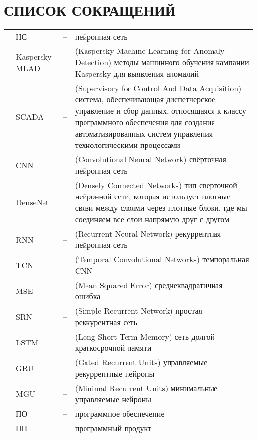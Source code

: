 \sectionbreak \section*{ 
    \gostTitleFont
    \redline
    СПИСОК СОКРАЩЕНИЙ
}
\titlespace

{\gostFont

\begin{tabular}{p{0.85cm} p{1.75cm} p{0.3cm} p{131.5mm}}
    & НС & {--} & нейронная сеть \\
    & Kaspersky MLAD & {--} & (Kaspersky Machine Learning for Anomaly Detection) методы машинного обучения кампании Kaspersky для выявления аномалий \\
    & SCADA & {--} & (Supervisory for Control And Data Acquisition) система, обеспечивающая диспетчерское управление и сбор данных, относящаяся к классу программного обеспечения для создания автоматизированных систем управления технологическими процессами \\
    & CNN & {--} & (Convolutional Neural Network) свёрточная нейронная сеть \\
    & DenseNet & {--} & (Densely Connected Networks) тип сверточной нейронной сети, которая использует плотные связи между слоями через плотные блоки, где мы соединяем все слои напрямую друг с другом \\
    & RNN & {--} & (Recurrent Neural Network) рекуррентная нейронная сеть \\
    & TCN & {--} & (Temporal Convolutional Networks) темпоральная CNN \\
    & MSE & {--} & (Mean Squared Error) среднеквадратичная ошибка \\
    & SRN & {--} & (Simple Recurrent Network) простая реккурентная сеть \\
    & LSTM & {--} & (Long Short-Term Memory) сеть долгой краткосрочной памяти \\
    & GRU & {--} & (Gated Recurrent Units) управляемые рекуррентные нейроны \\
    & MGU & {--} & (Minimal Recurrent Units) минимальные управляемые нейроны \\
    & ПО & {--} & программное обеспечение \\
    & ПП & {--} & программный продукт \\
\end{tabular}

}

